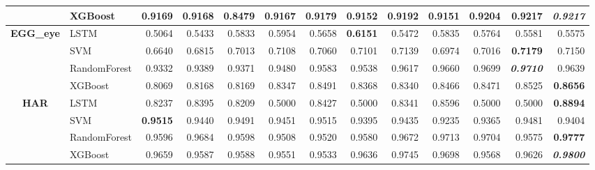 \begin{table}[H]
\begin{adjustbox}{max width=12cm}
\begin{tabular}{|c|l|r|r|r|r|r|r|r|r|r|r|r|}
			                      & XGBoost      & 0.9169                   & 0.9168          & 0.8479          & 0.9167          & 0.9179                   & 0.9152          & 0.9192 & 0.9151 & 0.9204          & 0.9217                   & \textit{\textbf{0.9217}} \\
			\hline
			\textbf{EGG\_eye}     & LSTM         & 0.5064                   & 0.5433          & 0.5833          & 0.5954          & 0.5658                   & \textbf{0.6151} & 0.5472 & 0.5835 & 0.5764          & 0.5581                   & 0.5575                   \\
			                      & SVM          & 0.6640                   & 0.6815          & 0.7013          & 0.7108          & 0.7060                   & 0.7101          & 0.7139 & 0.6974 & 0.7016          & \textbf{0.7179}          & 0.7150                   \\
			                      & RandomForest & 0.9332                   & 0.9389          & 0.9371          & 0.9480          & 0.9583                   & 0.9538          & 0.9617 & 0.9660 & 0.9699          & \textit{\textbf{0.9710}} & 0.9639                   \\
			                      & XGBoost      & 0.8069                   & 0.8168          & 0.8169          & 0.8347          & 0.8491                   & 0.8368          & 0.8340 & 0.8466 & 0.8471          & 0.8525                   & \textbf{0.8656}          \\
			\hline
			\textbf{HAR}          & LSTM         & 0.8237                   & 0.8395          & 0.8209          & 0.5000          & 0.8427                   & 0.5000          & 0.8341 & 0.8596 & 0.5000          & 0.5000                   & \textbf{0.8894}          \\
			                      & SVM          & \textbf{0.9515}          & 0.9440          & 0.9491          & 0.9451          & 0.9515                   & 0.9395          & 0.9435 & 0.9235 & 0.9365          & 0.9481                   & 0.9404                   \\
			                      & RandomForest & 0.9596                   & 0.9684          & 0.9598          & 0.9508          & 0.9520                   & 0.9580          & 0.9672 & 0.9713 & 0.9704          & 0.9575                   & \textbf{0.9777}          \\
			                      & XGBoost      & 0.9659                   & 0.9587          & 0.9588          & 0.9551          & 0.9533                   & 0.9636          & 0.9745 & 0.9698 & 0.9568          & 0.9626                   & \textit{\textbf{0.9800}} \\

\end{tabular}
\end{adjustbox}
\end{table}
